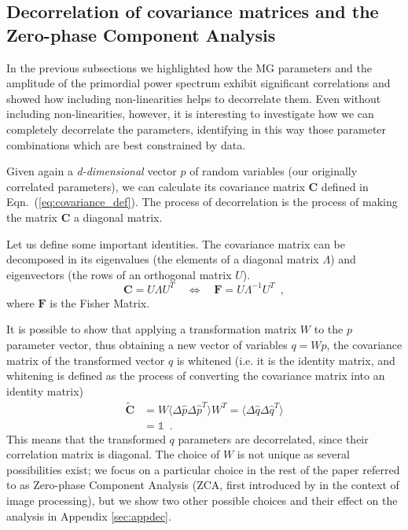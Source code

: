 \subsection{\label{sub:Decorrelation-of-covariance}Decorrelation of covariance
matrices and the Zero-phase Component Analysis}

In the previous subsections we highlighted how the MG parameters and the 
amplitude of the primordial power spectrum exhibit significant correlations and showed how including non-linearities helps to decorrelate them. Even without including non-linearities, however, it is interesting to investigate how we can completely decorrelate the parameters, identifying in this way those parameter combinations which are best constrained by data.

Given again a \emph{d-dimensional} vector
$p$ of random variables (our originally correlated parameters), we can calculate its covariance matrix $\mathbf C$ defined in Eqn.\ (\ref{eq:covariance_def}). The process of decorrelation is the process of making the matrix $\mathbf C$ 
a diagonal matrix.

Let us define some important identities. The covariance
matrix can be decomposed in its eigenvalues (the elements of a diagonal matrix $\Lambda$) and eigenvectors
(the rows of an orthogonal matrix $U$).
\begin{equation}
\mathbf C=U\Lambda U^{T} \quad \Leftrightarrow \quad 
\mathbf F=U\Lambda^{-1}U^{T} \,\,\, ,
\label{eq:eigensystemofC}
\end{equation}
where $\mathbf F$ is the Fisher Matrix.

It is possible to show that applying a transformation matrix $W$ to the $p$ parameter vector, thus obtaining a new vector of variables $q=Wp$, the covariance matrix of the transformed vector $q$ is whitened (i.e. it is the identity matrix, and whitening is defined as the process
of converting the covariance matrix into an identity matrix)
\begin{align}
\mathbf {\tilde{C}} & =W\langle\Delta\hat{p}\Delta\hat{p}^{T}\rangle W^{T} =\langle\Delta\hat{q}\Delta\hat{q}^{T}\rangle \label{eq:Cwhitened}\\
 & = \mathbb{1} \,\,\, . \nonumber
\end{align} 
This means that the transformed $q$ parameters are decorrelated, since their correlation matrix is diagonal. The choice of $W$ 
is not unique as several  possibilities
exist; we focus on a particular choice in the rest of the paper referred to as Zero-phase Component Analysis (ZCA, first 
introduced by \cite{Bell19973327} in the context of image processing), but we show
two other possible choices and their effect on the analysis in Appendix
\ref{sec:appdec}.

